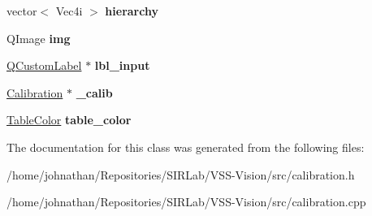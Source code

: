\begin{DoxyCompactItemize}
\item 
vector$<$ Vec4i $>$ {\bfseries hierarchy}\hypertarget{classcalibration_a818940843ae109ee2e7bd3cb202c4704}{}\label{classcalibration_a818940843ae109ee2e7bd3cb202c4704}

\item 
Q\+Image {\bfseries img}\hypertarget{classcalibration_abb31447445117b52af6865628355a76a}{}\label{classcalibration_abb31447445117b52af6865628355a76a}

\item 
\hyperlink{classQCustomLabel}{Q\+Custom\+Label} $\ast$ {\bfseries lbl\+\_\+input}\hypertarget{classcalibration_ade63c6e2fc49e68c15514133f30cbc65}{}\label{classcalibration_ade63c6e2fc49e68c15514133f30cbc65}

\item 
\hyperlink{structcommon_1_1Calibration}{Calibration} $\ast$ {\bfseries \+\_\+calib}\hypertarget{classcalibration_ad523b82addd861c31202b3d0d152f848}{}\label{classcalibration_ad523b82addd861c31202b3d0d152f848}

\item 
\hyperlink{structcommon_1_1TableColor}{Table\+Color} {\bfseries table\+\_\+color}\hypertarget{classcalibration_a941d98916460576b4bb2bfe9dd7c8f85}{}\label{classcalibration_a941d98916460576b4bb2bfe9dd7c8f85}

\end{DoxyCompactItemize}


The documentation for this class was generated from the following files\+:\begin{DoxyCompactItemize}
\item 
/home/johnathan/\+Repositories/\+S\+I\+R\+Lab/\+V\+S\+S-\/\+Vision/src/calibration.\+h\item 
/home/johnathan/\+Repositories/\+S\+I\+R\+Lab/\+V\+S\+S-\/\+Vision/src/calibration.\+cpp\end{DoxyCompactItemize}
